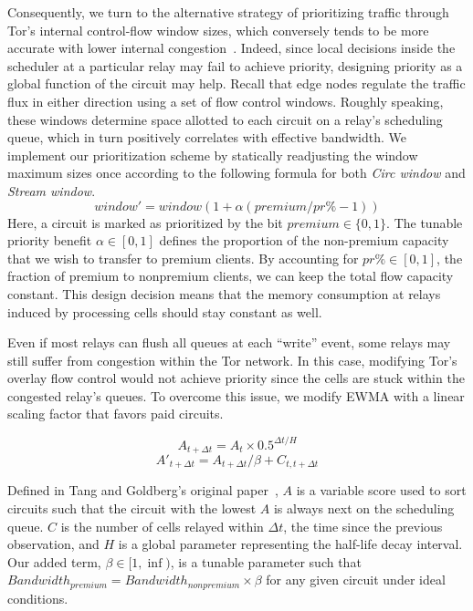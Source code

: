 Consequently, we turn to the alternative strategy of prioritizing traffic through Tor's internal control-flow window sizes, which conversely tends to be more accurate with lower internal congestion~\cite{archive-2009-mail, kiraly2008solving}.
Indeed, since local decisions inside the scheduler at a particular relay may fail to achieve priority, designing priority as a global function of the circuit may help.
Recall that edge nodes regulate the traffic flux in either direction using a set of flow control windows.
Roughly speaking, these windows determine space allotted to each circuit on a relay's scheduling queue, which in turn positively correlates with effective bandwidth.
We implement our prioritization scheme by statically readjusting the window maximum sizes once according to the following formula for both \emph{Circ window} and \emph{Stream window}.
\begin{equation} window' = window(1+ \alpha(premium / pr\% - 1)) \label{eq:flow} \end{equation} Here, a circuit is marked as prioritized by the bit $premium \in \{0, 1\}$.
The tunable priority benefit $\alpha \in [0, 1]$ defines the proportion of the non-premium capacity that we wish to transfer to premium clients.
By accounting for $pr\% \in [0,1]$, the fraction of premium to nonpremium clients, we can keep the total flow capacity constant.
This design decision means that the memory consumption at relays induced by processing cells should stay constant as well.

Even if most relays can flush all queues at each ``write'' event, some relays may still suffer from congestion within the Tor network.
In this case, modifying Tor's overlay flow control would not achieve priority since the cells are stuck within the congested relay's queues.
To overcome this issue, we modify EWMA with a linear scaling factor that favors paid circuits.

\begin{equation}
  A_{t + \Delta t} = A_t \times 0.5^{\Delta t/H}
\end{equation}
\begin{equation}
  A'_{t + \Delta t} = A_{t + \Delta t} / \beta + C_{t, t + \Delta t}
\end{equation}

Defined in Tang and Goldberg's original paper~\cite{tang2010improved}, $A$ is a variable score used to sort circuits such that the circuit with the lowest $A$ is always next on the scheduling queue.
$C$ is the number of cells relayed within $\Delta t$, the time since the previous observation, and $H$ is a global parameter representing the half-life decay interval.
Our added term, $\beta \in [1, \inf)$, is a tunable parameter such that $\mathit{Bandwidth}_{\mathit{premium}} = \mathit{Bandwidth}_{\mathit{nonpremium}} \times \beta$ for any given circuit under ideal conditions.

